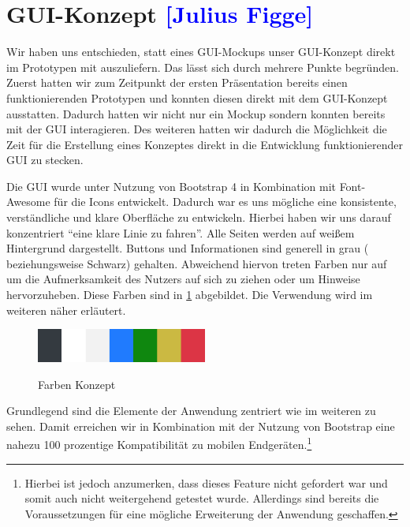

\section{GUI-Konzept \textcolor{blue}{[Julius Figge]}}

Wir haben uns entschieden, statt eines GUI-Mockups unser GUI-Konzept direkt im Prototypen mit auszuliefern.
Das lässt sich durch mehrere Punkte begründen.
Zuerst hatten wir zum Zeitpunkt der ersten Präsentation bereits einen funktionierenden Prototypen und konnten diesen direkt mit dem GUI-Konzept ausstatten. Dadurch hatten wir nicht nur ein Mockup sondern konnten bereits mit der GUI interagieren.
Des weiteren hatten wir dadurch die Möglichkeit die Zeit für die Erstellung eines Konzeptes direkt in die Entwicklung funktionierender GUI zu stecken.

Die GUI wurde unter Nutzung von Bootstrap 4 in Kombination mit Font-Awesome für die Icons entwickelt.
Dadurch war es uns mögliche eine konsistente, verständliche und klare Oberfläche zu entwickeln.
Hierbei haben wir uns darauf konzentriert \enquote{eine klare Linie zu fahren}. Alle Seiten werden auf weißem Hintergrund dargestellt. Buttons und Informationen sind generell in grau ( beziehungsweise Schwarz) gehalten.
Abweichend hiervon treten Farben nur auf um die Aufmerksamkeit des Nutzers auf sich zu ziehen oder um Hinweise hervorzuheben. Diese Farben sind in \cref{fig:farbmuster} abgebildet. Die Verwendung wird im weiteren näher erläutert.

\begin{figure}[hbt]
    \centering
    \begin{minipage}[t]{1\textwidth}
        \caption{Farben Konzept}
        \includegraphics[width=0.5\textwidth]{img/Farbmuster.png}\\
        \label{fig:farbmuster}
    \end{minipage}
\end{figure}


Grundlegend sind die Elemente der Anwendung zentriert wie im weiteren zu sehen. Damit erreichen wir in Kombination mit der Nutzung von Bootstrap eine nahezu 100 prozentige Kompatibilität zu mobilen Endgeräten.\footnote{Hierbei ist jedoch anzumerken, dass dieses Feature nicht gefordert war und somit auch nicht weitergehend getestet wurde. Allerdings sind bereits die Voraussetzungen für eine mögliche Erweiterung der Anwendung geschaffen.}

